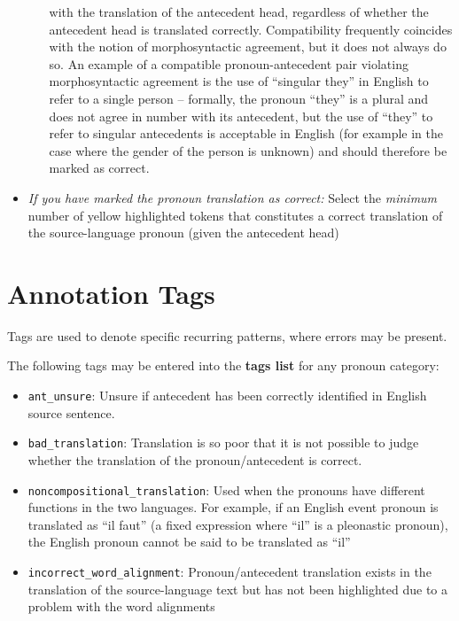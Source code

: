 \documentclass[11pt]{article} %
\newcommand\tag[1]{\texttt{#1}}
\begin{document}
\begin{itemize}
\begin{itemize}
	    with the translation of the antecedent head, regardless of whether
	    the antecedent head is translated correctly. Compatibility
	    frequently coincides with the notion of morphosyntactic agreement,
	    but it does not always do so. An example of a compatible
	    pronoun-antecedent pair violating morphosyntactic agreement is the
	    use of ``singular they'' in English to refer to a single person --
	    formally, the pronoun ``they'' is a plural and does not agree in
	    number with its antecedent, but the use of ``they'' to refer to
	    singular antecedents is acceptable in English (for example in the
	    case where the gender of the person is unknown) and should
	    therefore be marked as correct.
  \end{itemize}
  \item \textit{If you have marked the pronoun translation as correct:} Select the \textit{minimum} number of yellow highlighted tokens that constitutes a correct translation of the source-language pronoun (given the antecedent head)
\end{itemize}


\section{Annotation Tags}
\label{Tags}
Tags are used to denote specific recurring patterns, where errors may be present.

The following tags may be entered into the \textbf{tags list} for any pronoun category:

\begin{itemize}
  \item \tag{ant\_unsure}: Unsure if antecedent has been correctly identified in English source sentence.
  \item \tag{bad\_translation}: Translation is so poor that it is not possible to judge whether the translation of the pronoun/antecedent is correct.
  \item \tag{noncompositional\_translation}: Used when the pronouns have different functions in the two languages. For example, if an English event pronoun is translated as ``il faut'' (a fixed expression where ``il'' is a pleonastic pronoun), the English pronoun cannot be said to be translated as ``il''
  \item \tag{incorrect\_word\_alignment}: Pronoun/antecedent translation exists in the translation of the source-language text but has not been highlighted due to a problem with the word alignments
\end{itemize}  
\end{document}
